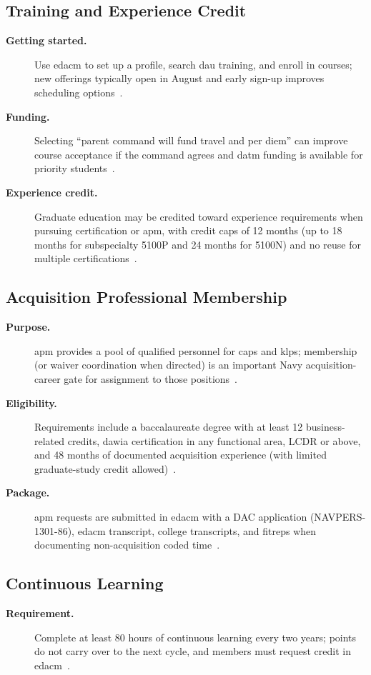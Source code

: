 \documentclass[../main.tex]{subfiles}
\begin{document}
\subsection{Training and Experience Credit}
\begin{description}
  \item[\textbf{Getting started.}] Use \ac{edacm} to set up a profile, search \ac{dau} training, and enroll in
  courses; new offerings typically open in August and early sign-up improves scheduling options~\autocite{edo-5-2-1-dawia-2025}.
  \item[\textbf{Funding.}] Selecting ``parent command will fund travel and per diem'' can improve course
  acceptance if the command agrees and \ac{datm} funding is available for priority students~\autocite{edo-5-2-1-dawia-2025}.
  \item[\textbf{Experience credit.}] Graduate education may be credited toward experience requirements when
  pursuing certification or \ac{apm}, with credit caps of 12 months (up to 18 months for subspecialty 5100P
  and 24 months for 5100N) and no reuse for multiple certifications~\autocite{edo-5-2-1-dawia-2025}.
\end{description}

\subsection{Acquisition Professional Membership}
\begin{description}
  \item[\textbf{Purpose.}] \ac{apm} provides a pool of qualified personnel for \acp{cap} and \acp{klp}; membership
  (or waiver coordination when directed) is an important Navy acquisition-career gate for assignment to those positions~\autocite{edo-5-2-1-dawia-2025}.
  \item[\textbf{Eligibility.}] Requirements include a baccalaureate degree with at least 12 business-related
  credits, \ac{dawia} certification in any functional area, LCDR or above, and 48 months of documented
  acquisition experience (with limited graduate-study credit allowed)~\autocite{edo-5-2-1-dawia-2025}.
  \item[\textbf{Package.}] \ac{apm} requests are submitted in \ac{edacm} with a DAC application (NAVPERS-1301-86),
  \ac{edacm} transcript, college transcripts, and \acp{fitrep} when documenting non-acquisition coded time~\autocite{edo-5-2-1-dawia-2025}.
\end{description}

\subsection{Continuous Learning}
\begin{description}
  \item[\textbf{Requirement.}] Complete at least 80 hours of continuous learning every two years; points do not
  carry over to the next cycle, and members must request credit in \ac{edacm}~\autocite{edo-5-2-1-dawia-2025,DoDI-5000-66-DAWIA-2022,DAU-Continuous-Learning-2026}.
\end{description}
\end{document}
